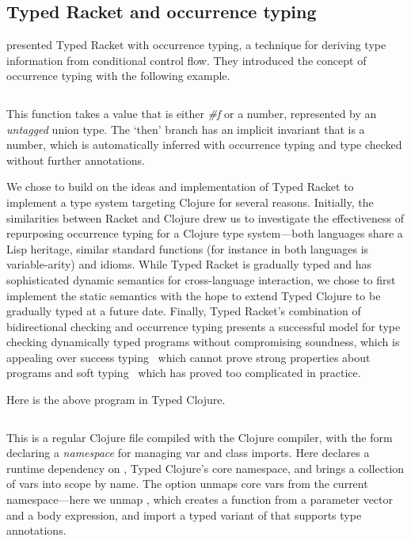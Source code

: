 \subsection{Typed Racket and occurrence typing}

\citet{TF10}
presented Typed Racket with occurrence typing,
a technique for deriving type information from conditional control flow.
They introduced the concept of occurrence typing 
with the following example.

\inputminted[firstline=1]{racket}{code/tr/example1.rkt}

This function takes a value that is either \emph{\#f} %
or a number, represented by an \emph{untagged} union type.
The `then' branch has an implicit invariant
that  is a number, which is automatically inferred with occurrence typing
and type checked without further annotations.

We chose to build on the ideas and implementation
of Typed Racket to implement a type system targeting Clojure for several reasons.
Initially, the similarities between Racket and Clojure drew us to
investigate the effectiveness of repurposing occurrence typing
for a Clojure type system---both languages share a Lisp heritage,
similar standard functions 
(for instance 
in both languages is variable-arity)
and idioms.
While Typed Racket is gradually typed and has sophisticated
dynamic semantics for cross-language interaction, we 
chose to first implement
the static semantics
with the hope to extend Typed Clojure to be gradually typed at a future date.
Finally,
Typed Racket's combination of bidirectional checking
and occurrence typing presents a successful model for 
type checking dynamically typed programs without compromising
soundness, which is appealing over success typing~\cite{Lindahl:2006:PTI}
which cannot prove strong properties about programs
and soft typing~\cite{CF91}
which has proved too complicated in practice.

\newpage
Here is the above program in Typed Clojure.
\begin{exmp}
\inputminted[firstline=1]{clojure}{code/demo/src/demo/eg1.clj}
\label{example:conditionalflow}
\end{exmp}

This is a regular Clojure file compiled with
the Clojure compiler, with the  form
declaring a
\emph{namespace}
for managing var and class imports.
Here  declares a runtime dependency 
on
,
Typed Clojure's core namespace, and
brings a collection of vars into scope by name.
The   option unmaps core vars from the current 
namespace---here we unmap ,
which creates a function from a parameter vector and a body expression,
and import a typed variant of 
that supports type annotations.

